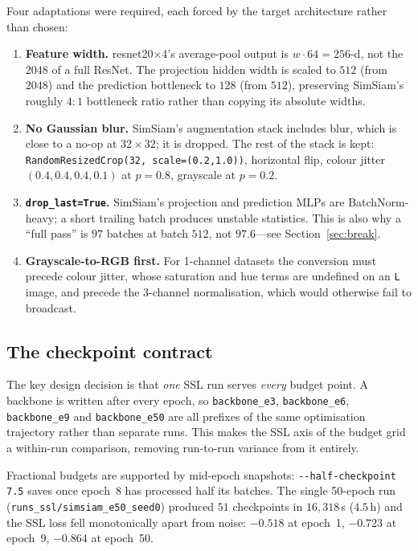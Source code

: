 \documentclass[11pt,a4paper]{article}
\newcommand{\code}[1]{\texttt{\small #1}}
\newcommand{\file}[1]{\texttt{\small #1}}
\begin{document}
Four adaptations were required, each forced by the target architecture rather
than chosen:

\begin{enumerate}[leftmargin=*]
\item \textbf{Feature width.} resnet20$\times$4's average-pool output is
      $w\cdot 64 = 256$-d, not the $2048$ of a full ResNet. The projection
      hidden width is scaled to $512$ (from $2048$) and the prediction
      bottleneck to $128$ (from $512$), preserving SimSiam's roughly $4{:}1$
      bottleneck ratio rather than copying its absolute widths.
\item \textbf{No Gaussian blur.} SimSiam's augmentation stack includes blur,
      which is close to a no-op at $32\times32$; it is dropped. The rest of the
      stack is kept: \code{RandomResizedCrop(32, scale=(0.2,1.0))}, horizontal
      flip, colour jitter $(0.4,0.4,0.4,0.1)$ at $p{=}0.8$, grayscale at
      $p{=}0.2$.
\item \textbf{\code{drop\_last=True}.} SimSiam's projection and prediction MLPs
      are BatchNorm-heavy; a short trailing batch produces unstable statistics.
      This is also why a ``full pass'' is $97$ batches at batch $512$, not
      $97.6$---see Section~\ref{sec:break}.
\item \textbf{Grayscale-to-RGB first.} For 1-channel datasets the conversion
      must precede colour jitter, whose saturation and hue terms are undefined
      on an \code{L} image, and precede the 3-channel normalisation, which
      would otherwise fail to broadcast.
\end{enumerate}

\subsection{The checkpoint contract}

The key design decision is that \emph{one} SSL run serves \emph{every} budget
point. A backbone is written after every epoch, so \code{backbone\_e3},
\code{backbone\_e6}, \code{backbone\_e9} and \code{backbone\_e50} are all
prefixes of the same optimisation trajectory rather than separate runs. This
makes the SSL axis of the budget grid a within-run comparison, removing
run-to-run variance from it entirely.

Fractional budgets are supported by mid-epoch snapshots:
\code{-{}-half-checkpoint 7.5} saves once epoch~8 has processed half its
batches. The single 50-epoch run
(\file{runs\_ssl/simsiam\_e50\_seed0}) produced $51$ checkpoints in
$16{,}318$\,s ($4.5$\,h) and the SSL loss fell monotonically apart from noise:
$-0.518$ at epoch~1, $-0.723$ at epoch~9, $-0.864$ at epoch~50.
\end{document}
